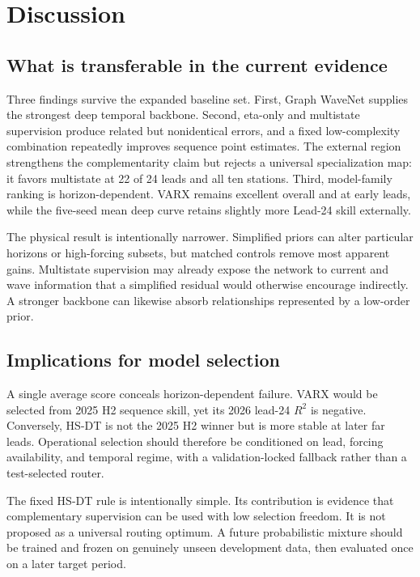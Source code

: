 \documentclass[final,5p,times,twocolumn]{elsarticle}
\begin{document}
\clearpage
\section{Discussion}
\subsection{What is transferable in the current evidence}
Three findings survive the expanded baseline set. First, Graph WaveNet supplies the strongest deep temporal backbone. Second, eta-only and multistate supervision produce related but nonidentical errors, and a fixed low-complexity combination repeatedly improves sequence point estimates. The external region strengthens the complementarity claim but rejects a universal specialization map: it favors multistate at 22 of 24 leads and all ten stations. Third, model-family ranking is horizon-dependent. VARX remains excellent overall and at early leads, while the five-seed mean deep curve retains slightly more Lead-24 skill externally.

The physical result is intentionally narrower. Simplified priors can alter particular horizons or high-forcing subsets, but matched controls remove most apparent gains. Multistate supervision may already expose the network to current and wave information that a simplified residual would otherwise encourage indirectly. A stronger backbone can likewise absorb relationships represented by a low-order prior.

\subsection{Implications for model selection}
A single average score conceals horizon-dependent failure. VARX would be selected from 2025 H2 sequence skill, yet its 2026 lead-24 $R^2$ is negative. Conversely, HS-DT is not the 2025 H2 winner but is more stable at later far leads. Operational selection should therefore be conditioned on lead, forcing availability, and temporal regime, with a validation-locked fallback rather than a test-selected router.

The fixed HS-DT rule is intentionally simple. Its contribution is evidence that complementary supervision can be used with low selection freedom. It is not proposed as a universal routing optimum. A future probabilistic mixture should be trained and frozen on genuinely unseen development data, then evaluated once on a later target period.
\end{document}
